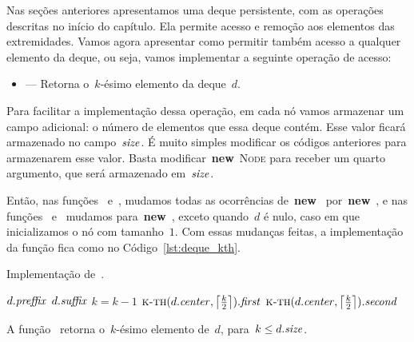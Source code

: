 \documentclass[main.tex]{subfiles}
\begin{document}
Nas seções anteriores apresentamos uma deque persistente, com as operações descritas no início do capítulo. Ela permite acesso e remoção aos elementos das extremidades. Vamos agora apresentar como permitir também acesso a qualquer elemento da deque, ou seja, vamos implementar a seguinte operação de acesso:

\begin{itemize}
    \item {} --- Retorna o~$k$-ésimo elemento da deque~$d$.
\end{itemize}

Para facilitar a implementação dessa operação, em cada nó vamos armazenar um campo adicional: o número de elementos que essa deque contém. Esse valor ficará armazenado no campo~$\mathit{size}$. É muito simples modificar os códigos anteriores para armazenarem esse valor. Basta modificar~\mbox{\textbf{new} \textsc{Node}} para receber um quarto argumento, que será armazenado em~$\mathit{size}$.

Então, nas funções~ e~, mudamos todas as ocorrências de~\mbox{\textbf{new} } por~\mbox{\textbf{new} }, e nas funções~ e~ mudamos para~\mbox{\textbf{new} }, exceto quando~$d$ é nulo, caso em que inicializamos o nó com tamanho~$1$.
Com essas mudanças feitas, a implementação da função fica como no Código~\ref{lst:deque_kth}.

\begin{algorithm}
\caption{Implementação de~.} \label{lst:deque_kth}
\begin{algorithmic}[1]

        \State \Return $d.\mathit{preffix}$\label{line:kth:if1}
    \EndIf
        \State \Return $d.\mathit{suffix}$ \label{line:kth:if2}
    \EndIf
        \State $k = k - 1$ \label{line:kth:if3}
    \EndIf
        \State \Return $\Call{k-th}{d.\V{center}, \ceil*{\frac{k}{2}}}.\V{first}$
    \Else
        \State \Return $\Call{k-th}{d.\V{center}, \ceil*{\frac{k}{2}}}.\V{second}$
    \EndIf
\EndFunction

\end{algorithmic}
\end{algorithm}


\begin{proposition}
A função~ retorna o~$k$-ésimo elemento de~$d$, para~$k \leq d.\mathit{size}$.
\end{proposition}
\end{document}
